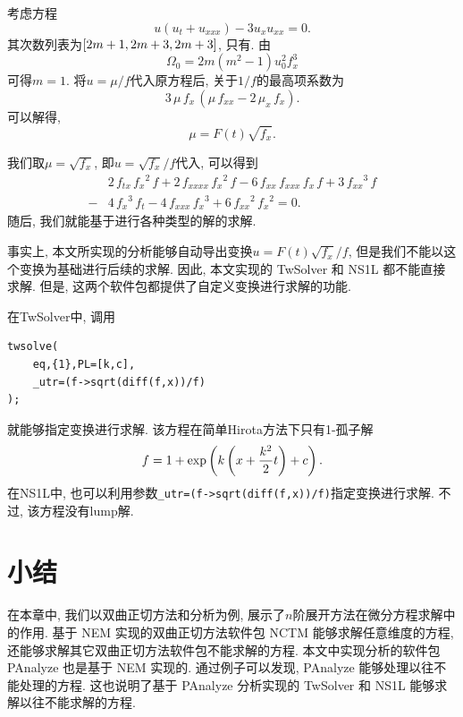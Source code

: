 \begin{example}
考虑方程
\begin{equation}
    u(u_t+u_{xxx})-3u_x u_{xx}=0. \label{pseq}
\end{equation}
其次数列表为$\left[2m+1,2m+3,2m+3\right]$, 只有\BPthree{}. 由
\begin{equation}
    \Omega_0=2m(m^2-1)u_0^2f_x^3
\end{equation}
可得$m=1$. 将$u=\mu/f$代入原方程后, 关于$1/f$的最高项系数为
\begin{equation}
    3\,\mu\,{{f}_{x}}\,\left( \mu\,{{f}_{xx}}-2\,{{\mu}_{x}}\,{{f}_{x}}\right) .
\end{equation}
可以解得, 
\begin{equation}
    \mu=F(t)\sqrt{f_x}.
\end{equation}
\end{example}
我们取$\mu=\sqrt{f_x}$, 即$u=\sqrt{f_x}/f$代入, 可以得到
\begin{equation}
\begin{split}
& 2\,{{f}_{tx}}\,{{{f}_{x}}}^{2}\,f+2\,{{f}_{xxxx}}\,{{{f}_{x}}}^{2}\,f-6\,{{f}_{xx}}\,{{f}_{xxx}}\,{{f}_{x}}\,f+3\,{{{f}_{xx}}}^{3}\,f \\
-&4\,{{{f}_{x}}}^{3}\,{{f}_{t}}-4\,{{f}_{xxx}}\,{{{f}_{x}}}^{3}+6\,{{{f}_{xx}}}^{2}\,{{{f}_{x}}}^{2}=0.
\end{split} \label{pseq-f}
\end{equation}
随后, 我们就能基于进行各种类型的解的求解.

事实上, 本文所实现的\Painleve{}分析能够自动导出变换$u=F(t)\sqrt{f_x}/f$, 但是我们不能以这个变换为基础进行后续的求解.  因此, 本文实现的 TwSolver 和 NS1L 都不能直接求解. 但是, 这两个软件包都提供了自定义变换进行求解的功能.

在TwSolver中, 调用
\begin{verbatim}
twsolve(
    eq,{1},PL=[k,c],
    _utr=(f->sqrt(diff(f,x))/f)
);
\end{verbatim}
就能够指定变换进行求解. 该方程在简单Hirota方法下只有1-孤子解
\begin{equation}
    f=1+\exp\left(k\left(x+\frac{k^2}{2}t\right)+c\right).
\end{equation}
在NS1L中, 也可以利用参数\verb|_utr=(f->sqrt(diff(f,x))/f)|指定变换进行求解. 不过, 该方程没有lump解. 

\section{小结}
在本章中, 我们以双曲正切方法和\Painleve{}分析为例, 展示了$n$阶展开方法在微分方程求解中的作用. 基于 NEM 实现的双曲正切方法软件包 NCTM 能够求解任意维度的方程, 还能够求解其它双曲正切方法软件包不能求解的方程. 本文中实现\Painleve{}分析的软件包 PAnalyze 也是基于 NEM 实现的. 通过例子可以发现, PAnalyze 能够处理以往不能处理的方程. 这也说明了基于 PAnalyze 分析实现的 TwSolver 和 NS1L 能够求解以往不能求解的方程. 


